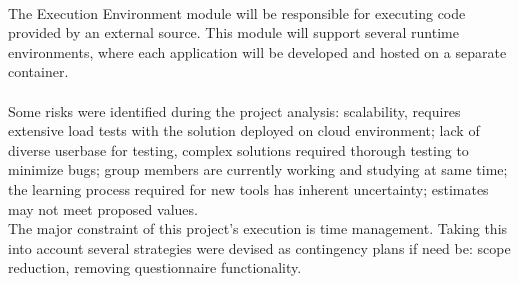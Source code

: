 \fi
\\
The Execution Environment module will be responsible for executing code provided by an external source. This module will support several runtime environments, where each application will be developed and hosted on a separate container.\cite{ref1}
\\
\\
Some risks were identified during the project analysis: scalability, requires extensive load tests with the solution deployed on cloud environment; lack of diverse userbase for testing, complex solutions required thorough testing to minimize bugs; group members are currently working and studying at same time; the learning process required for new tools has inherent uncertainty; estimates may not meet proposed values.
\\
The major constraint of this project's execution is time management. Taking this into account several strategies were devised as contingency plans if need be: scope reduction, removing questionnaire functionality.